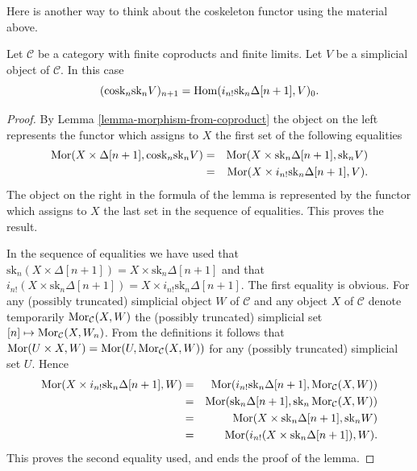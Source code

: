 \noindent
Here is another way to think about the coskeleton functor
using the material above.

\begin{lemma}
\label{lemma-cosk-shriek}
Let $\mathcal{C}$ be a category with finite coproducts
and finite limits. Let $V$ be a simplicial object of $\mathcal{C}$.
In this case
$$
(\text{cosk}_n \text{sk}_n V)_{n + 1}
=
\mathop{\mathrm{Hom}}\nolimits(i_{n !}\text{sk}_n \Delta[n + 1], V)_0.
$$
\end{lemma}

\begin{proof}
By Lemma \ref{lemma-morphism-from-coproduct}
the object on the left represents the functor
which assigns to $X$ the first set of the following
equalities
\begin{eqnarray*}
\mathop{\mathrm{Mor}}\nolimits(X \times \Delta[n + 1], \text{cosk}_n \text{sk}_n V)
& = &
\mathop{\mathrm{Mor}}\nolimits(X \times \text{sk}_n \Delta[n + 1], \text{sk}_n V) \\
& = &
\mathop{\mathrm{Mor}}\nolimits(X \times i_{n !} \text{sk}_n \Delta[n + 1], V).
\end{eqnarray*}
The object on the right in the formula of the lemma
is represented by the functor which assigns to $X$
the last set in the sequence of equalities.
This proves the result.

\medskip\noindent
In the sequence of equalities we have used that
$\text{sk}_n (X \times \Delta[n + 1]) = X \times \text{sk}_n \Delta[n + 1]$
and that
$i_{n!}(X \times \text{sk}_n \Delta[n + 1]) =
X \times i_{n !} \text{sk}_n \Delta[n + 1]$.
The first equality is obvious. For any (possibly truncated)
simplicial object $W$
of $\mathcal{C}$ and any object $X$ of $\mathcal{C}$
denote temporarily $\mathop{\mathrm{Mor}}\nolimits_\mathcal{C}(X, W)$ the
(possibly truncated) simplicial set
$[n] \mapsto \mathop{\mathrm{Mor}}\nolimits_\mathcal{C}(X, W_n)$. From the definitions
it follows that $\mathop{\mathrm{Mor}}\nolimits(U \times X, W) =
\mathop{\mathrm{Mor}}\nolimits(U, \mathop{\mathrm{Mor}}\nolimits_\mathcal{C}(X, W))$ for any
(possibly truncated) simplicial set $U$. Hence
\begin{eqnarray*}
\mathop{\mathrm{Mor}}\nolimits(X \times i_{n !} \text{sk}_n \Delta[n + 1], W)
& = &
\mathop{\mathrm{Mor}}\nolimits(i_{n !} \text{sk}_n \Delta[n + 1], \mathop{\mathrm{Mor}}\nolimits_\mathcal{C}(X, W)) \\
& = &
\mathop{\mathrm{Mor}}\nolimits(\text{sk}_n \Delta[n + 1],
\text{sk}_n\mathop{\mathrm{Mor}}\nolimits_\mathcal{C}(X, W)) \\
& = &
\mathop{\mathrm{Mor}}\nolimits(X \times \text{sk}_n \Delta[n + 1], \text{sk}_nW) \\
& = &
\mathop{\mathrm{Mor}}\nolimits(i_{n!}(X \times \text{sk}_n \Delta[n + 1]), W).
\end{eqnarray*}
This proves the second equality used, and ends the proof of the lemma.
\end{proof}




